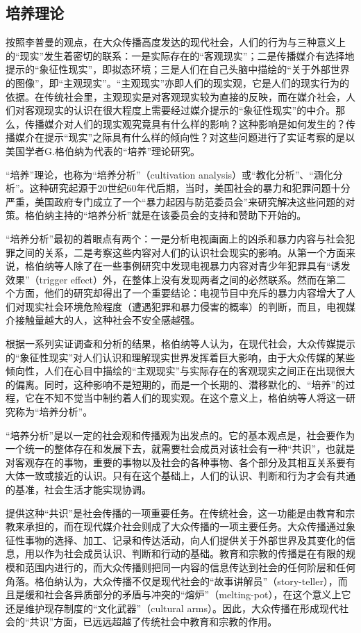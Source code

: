 \documentclass[UTF8,12pt]{ctexart}
\numberwithin{equation}{section} %
\numberwithin{figure}{section}
\numberwithin{table}{section}
\begin{document}
	\subsection{培养理论}
	按照李普曼的观点，在大众传播高度发达的现代社会，人们的行为与三种意义上的“现实”发生着密切的联系：一是实际存在的“客观现实”；二是传播媒介有选择地提示的“象征性现实”，即拟态环境；三是人们在自己头脑中描绘的“关于外部世界的图像”，即“主观现实”。“主观现实”亦即人们的现实观，它是人们的现实行为的依据。在传统社会里，主观现实是对客观现实较为直接的反映，而在媒介社会，人们对客观现实的认识在很大程度上需要经过媒介提示的“象征性现实”的中介。那么，传播媒介对人们的现实观究竟具有什么样的影响？这种影响是如何发生的？传播媒介在提示“现实”之际具有什么样的倾向性？对这些问题进行了实证考察的是以美国学者G.格伯纳为代表的“培养”理论研究。
	
	“培养”理论，也称为“培养分析”（cultivation analysis）或“教化分析”、“涵化分析”。这种研究起源于20世纪60年代后期，当时，美国社会的暴力和犯罪问题十分严重，美国政府专门成立了一个“暴力起因与防范委员会”来研究解决这些问题的对策。格伯纳主持的“培养分析”就是在该委员会的支持和赞助下开始的。
	
	“培养分析”最初的着眼点有两个：一是分析电视画面上的凶杀和暴力内容与社会犯罪之间的关系，二是考察这些内容对人们的认识社会现实的影响。从第一个方面来说，格伯纳等人除了在一些事例研究中发现电视暴力内容对青少年犯罪具有“诱发效果”（trigger effect）外，在整体上没有发现两者之间的必然联系。然而在第二个方面，他们的研究却得出了一个重要结论：电视节目中充斥的暴力内容增大了人们对现实社会环境危险程度（遭遇犯罪和暴力侵害的概率）的判断，而且，电视媒介接触量越大的人，这种社会不安全感越强。
	
	根据一系列实证调查和分析的结果，格伯纳等人认为，在现代社会，大众传媒提示的“象征性现实”对人们认识和理解现实世界发挥着巨大影响，由于大众传媒的某些倾向性，人们在心目中描绘的“主观现实”与实际存在的客观现实之间正在出现很大的偏离。同时，这种影响不是短期的，而是一个长期的、潜移默化的、“培养”的过程，它在不知不觉当中制约着人们的现实观。在这个意义上，格伯纳等人将这一研究称为“培养分析”。
	
	“培养分析”是以一定的社会观和传播观为出发点的。它的基本观点是，社会要作为一个统一的整体存在和发展下去，就需要社会成员对该社会有一种“共识”，也就是对客观存在的事物，重要的事物以及社会的各种事物、各个部分及其相互关系要有大体一致或接近的认识。只有在这个基础上，人们的认识、判断和行为才会有共通的基准，社会生活才能实现协调。
	
	提供这种“共识”是社会传播的一项重要任务。在传统社会，这一功能是由教育和宗教来承担的，而在现代媒介社会则成了大众传播的一项主要任务。大众传播通过象征性事物的选择、加工、记录和传达活动，向人们提供关于外部世界及其变化的信息，用以作为社会成员认识、判断和行动的基础。教育和宗教的传播是在有限的规模和范围内进行的，而大众传播则把同一内容的信息传达到社会的任何阶层和任何角落。格伯纳认为，大众传播不仅是现代社会的“故事讲解员”（story-teller），而且是缓和社会各异质部分的矛盾与冲突的“熔炉”（melting-pot），在这个意义上它还是维护现存制度的“文化武器”（cultural arms）。因此，大众传播在形成现代社会的“共识”方面，已远远超越了传统社会中教育和宗教的作用。
	
\end{document}
